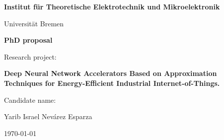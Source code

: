 
\begin{center}
\textbf{Institut f\"ur Theoretische Elektrotechnik und Mikroelektronik}
\vspace{5mm}

{\large Universit\"at Bremen}
\vspace{20mm}

\textbf{\Large PhD proposal}
\vspace{40mm}





Research project:

\textbf{Deep Neural Network Accelerators Based on Approximation Techniques for Energy-Efficient Industrial Internet-of-Things.}

\vspace{40mm}

Candidate name:

Yarib Israel Nev\'arez Esparza
\vspace{20mm}

\today

\end{center}


\pagebreak